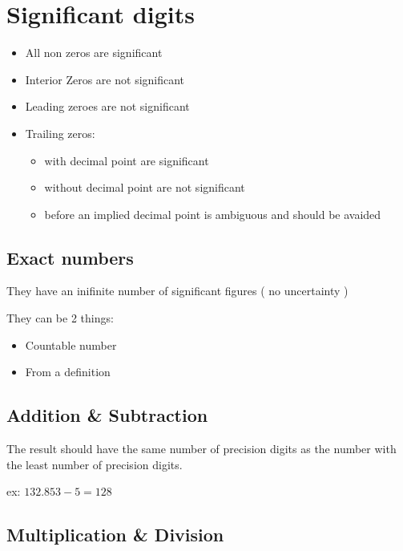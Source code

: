 \documentclass[openany]{book}
\begin{document}
\frontmatter
\tableofcontents
\clearpage

\mainmatter

\raggedright

\section{Significant digits}

\begin{itemize}
    \item All non zeros are significant
    \item Interior Zeros are not significant
    \item Leading zeroes are not significant
    \item Trailing zeros:
        \begin{itemize}
            \item with decimal point are significant
            \item without decimal point are not significant
            \item before an implied decimal point is ambiguous and should be avaided
        \end{itemize}
\end{itemize}

\subsection{Exact numbers}

They have an inifinite number of significant figures ( no uncertainty )

They can be 2 things:

\begin{itemize}
    \item Countable number
    \item From a definition    
\end{itemize}

\subsection{Addition \& Subtraction}

The result should have the same number of precision digits as the number with the least number of precision digits. 

ex: \( 132.853-5=128 \)

\subsection{Multiplication \& Division}
\end{document}
